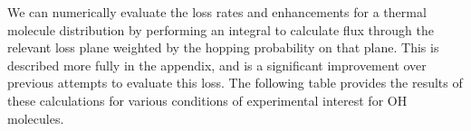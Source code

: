 \documentclass[%
 reprint,
 amsmath,amssymb,
 aps,
prl,
]{revtex4-1}
\begin{document}

We can numerically evaluate the loss rates and enhancements for a thermal molecule distribution by performing an integral to calculate flux through the relevant loss plane weighted by the hopping probability on that plane. This is described more fully in the appendix, and is a significant improvement over previous attempts to evaluate this loss. The following table provides the results of these calculations for various conditions of experimental interest for OH molecules.

\newcommand{\shiftright}[2]{\makebox[#1][r]{\makebox[0pt][l]{#2}}}
\end{document}
